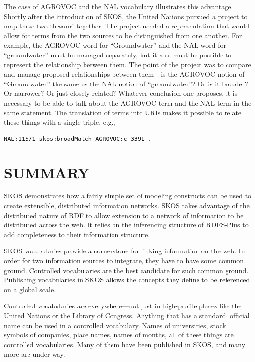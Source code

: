 The case of AGROVOC and the NAL vocabulary illustrates this advantage.
Shortly after the introduction of SKOS, the United Nations pursued a
project to map these two thesauri together. The project needed a
representation that would allow for terms from the two sources to be
distinguished from one another. For example, the AGROVOC word for
``Groundwater'' and the NAL word for ``groundwater'' must be managed
separately, but it also must be possible to represent the relationship
between them. The point of the project was to compare and manage
proposed relationships between them---is the AGROVOC notion of
``Groundwater'' the same as the NAL notion of ``groundwater''? Or is it
broader? Or narrower? Or just closely related? Whatever conclusion one
proposes, it is necessary to be able to talk about the AGROVOC term and
the NAL term in the same statement. The translation of terms into URIs
makes it possible to relate these things with a single triple, e.g.,

\begin{lstlisting}
NAL:11571 skos:broadMatch AGROVOC:c_3391 .
\end{lstlisting}

\section{SUMMARY}

SKOS demonstrates how a fairly simple set of modeling constructs can be
used to create extensible, distributed information networks. SKOS takes
advantage of the distributed nature of RDF to allow
extension to a network of information to be distributed across the web.
It relies on the inferencing structure of RDFS-Plus to add completeness
to their information structure.

SKOS vocabularies provide a cornerstone for linking information on the
web. In order for two information sources to integrate, they have to
have some common ground. Controlled vocabularies are the best candidate
for such common ground. Publishing vocabularies in SKOS allows the
concepts they define to be referenced on a global scale.

Controlled vocabularies are everywhere---not just in high-profile places
like the United Nations or
the Library of Congress. Anything that has a standard, official name can
be used in a controlled vocabulary. Names of universities, stock symbols
of companies, place names, names of months, all of these things are
controlled vocabularies. Many of them have been published in SKOS, and
many more are under way.

